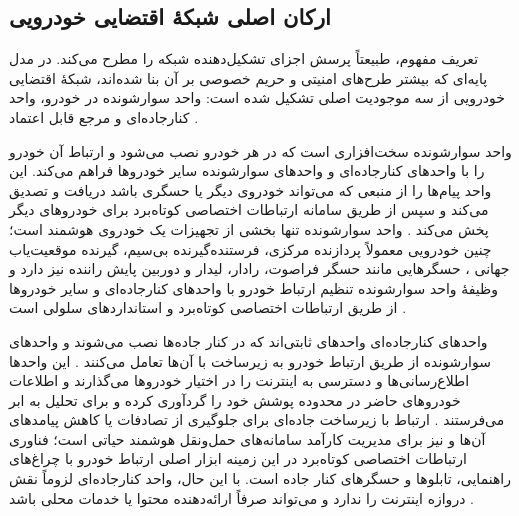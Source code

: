 \documentclass[12pt,a4paper]{article}
\begin{document}
\subsection{ارکان اصلی شبکهٔ اقتضایی خودرویی}

تعریف مفهوم، طبیعتاً پرسش اجزای تشکیل‌دهنده شبکه را مطرح می‌کند. در مدل پایه‌ای که بیشتر طرح‌های امنیتی و حریم خصوصی بر آن بنا شده‌اند، شبکهٔ اقتضایی خودرویی از سه موجودیت اصلی تشکیل شده است: واحد سوارشونده در خودرو، واحد کنارجاده‌ای و مرجع قابل اعتماد \cite{rahmawatiagustinaSystematicLiteratureReview2025}.

واحد سوارشونده  سخت‌افزاری است که در هر خودرو نصب می‌شود و ارتباط آن خودرو را با واحد‌های کنارجاده‌ای و واحد‌های سوارشونده سایر خودرو‌ها فراهم می‌کند. این واحد پیام‌ها را از منبعی که می‌تواند خودروی دیگر یا حسگری باشد دریافت و تصدیق می‌کند و سپس از طریق سامانه ارتباطات اختصاصی کوتاه‌برد  برای خودرو‌های دیگر پخش می‌کند \cite{hozouriOverviewVANETVehicular2023}. واحد سوارشونده تنها بخشی از تجهیزات یک خودروی هوشمند است؛ چنین خودرویی معمولاً پردازنده مرکزی، فرستنده‌گیرنده بی‌سیم، گیرنده موقعیت‌یاب جهانی ، حسگر‌هایی مانند حسگر فراصوت، رادار، لیدار  و دوربین پایش راننده نیز دارد و وظیفهٔ واحد سوارشونده تنظیم ارتباط خودرو با واحد‌های کنارجاده‌ای و سایر خودرو‌ها از طریق ارتباطات اختصاصی کوتاه‌برد و استاندارد‌های سلولی است \cite{hozouriOverviewVANETVehicular2023}.

واحد‌های کنارجاده‌ای  واحد‌های ثابتی‌اند که در کنار جاده‌ها نصب می‌شوند و واحد‌های سوارشونده از طریق ارتباط خودرو به زیرساخت با آن‌ها تعامل می‌کنند \cite{hozouriOverviewVANETVehicular2023}. این واحد‌ها اطلاع‌رسانی‌ها و دسترسی به اینترنت را در اختیار خودرو‌ها می‌گذارند و اطلاعات خودرو‌های حاضر در محدوده پوشش خود را گردآوری کرده و برای تحلیل به ابر می‌فرستند \cite{hozouriOverviewVANETVehicular2023}. ارتباط با زیرساخت جاده‌ای برای جلوگیری از تصادفات یا کاهش پیامد‌های آن‌ها و نیز برای مدیریت کارآمد سامانه‌های حمل‌ونقل هوشمند حیاتی است؛ فناوری ارتباطات اختصاصی کوتاه‌برد در این زمینه ابزار اصلی ارتباط خودرو با چراغ‌های راهنمایی، تابلو‌ها و حسگر‌های کنار جاده است. با این حال، واحد کنارجاده‌ای لزوماً نقش دروازه اینترنت را ندارد و می‌تواند صرفاً ارائه‌دهنده محتوا یا خدمات محلی باشد \cite{luConnectedVehiclesSolutions2014}.
\end{document}
